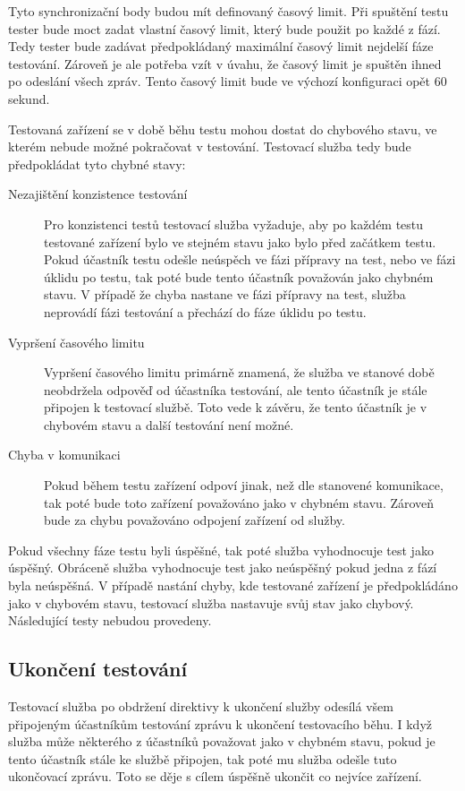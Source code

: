 Tyto synchronizační body budou mít definovaný časový limit. Při spuštění testu tester bude moct zadat vlastní časový limit, který bude použit po každé z fází. Tedy tester bude zadávat předpokládaný maximální časový limit nejdelší fáze testování. Zároveň je ale potřeba vzít v úvahu, že časový limit je spuštěn ihned po odeslání všech zpráv. Tento časový limit bude ve výchozí konfiguraci opět 60 sekund. 

Testovaná zařízení se v době běhu testu mohou dostat do chybového stavu, ve kterém nebude možné pokračovat v testování. Testovací služba tedy bude předpokládat tyto chybné stavy:


\begin{description}
    \item[Nezajištění konzistence testování] Pro konzistenci testů testovací služba vyžaduje, aby po každém testu testované zařízení bylo ve stejném stavu jako bylo před začátkem testu. Pokud účastník testu odešle neúspěch ve fázi přípravy na test, nebo ve fázi úklidu po testu, tak poté bude tento účastník považován jako chybném stavu. V případě že chyba nastane ve fázi přípravy na test, služba neprovádí fázi testování a přechází do fáze úklidu po testu. 
    \item[Vypršení časového limitu] Vypršení časového limitu primárně znamená, že služba ve stanové době neobdržela odpověď od účastníka testování, ale tento účastník je stále připojen k testovací službě. Toto vede k závěru, že tento účastník je v chybovém stavu a další testování není možné. 
    \item[Chyba v komunikaci] Pokud během testu zařízení odpoví jinak, než dle stanovené komunikace, tak poté bude toto zařízení považováno jako v chybném stavu. Zároveň bude za chybu považováno odpojení zařízení od služby.  
\end{description}

Pokud všechny fáze testu byli úspěšné, tak poté služba vyhodnocuje test jako úspěšný. Obráceně služba vyhodnocuje test jako neúspěšný pokud jedna z fází byla neúspěšná. V případě nastání chyby, kde testované zařízení je předpokládáno jako v chybovém stavu, testovací služba nastavuje svůj stav jako chybový. Následující testy nebudou provedeny.


\subsection{Ukončení testování}
Testovací služba po obdržení direktivy k ukončení služby odesílá všem připojeným účastníkům testování zprávu k ukončení testovacího běhu. I když služba může některého z účastníků považovat jako v chybném stavu, pokud je tento účastník stále ke službě připojen, tak poté mu služba odešle tuto ukončovací zprávu. Toto se děje s cílem úspěšně ukončit co nejvíce zařízení.


